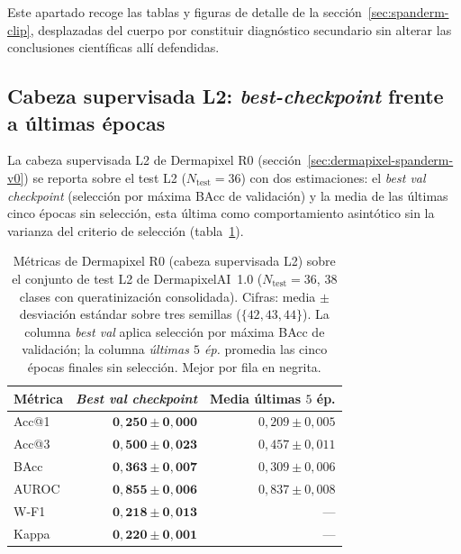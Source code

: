 Este apartado recoge las tablas y figuras de detalle de la
sección~\ref{sec:spanderm-clip}, desplazadas del cuerpo por
constituir diagnóstico secundario sin alterar las conclusiones
científicas allí defendidas.

\subsection{Cabeza supervisada L2: \emph{best-checkpoint} frente a
últimas épocas}
\label{sec:anexoi-l2-checkpoint}

La cabeza supervisada L2 de Dermapixel R0
(sección~\ref{sec:dermapixel-spanderm-v0}) se reporta sobre el test L2
($N_{\mathrm{test}} = 36$) con dos estimaciones: el \emph{best val
checkpoint} (selección por máxima BAcc de validación) y la media de las
últimas cinco épocas sin selección, esta última como comportamiento
asintótico sin la varianza del criterio de selección
(tabla~\ref{tab:dermapixel-spanderm-l2}).

\begin{table}[H]
\centering
\footnotesize
\setlength{\tabcolsep}{4pt}
\renewcommand{\arraystretch}{0.95}
\caption{Métricas de Dermapixel R0 (cabeza supervisada L2) sobre el
conjunto de test L2 de
DermapixelAI~1.0 ($N_{\mathrm{test}} = 36$, $38$ clases con
queratinización consolidada). Cifras: media $\pm$ desviación
estándar sobre tres semillas ($\{42, 43, 44\}$). La columna
\emph{best val} aplica selección por máxima BAcc de validación;
la columna \emph{últimas $5$ ép.} promedia las cinco épocas
finales sin selección. Mejor por fila en negrita.}
\label{tab:dermapixel-spanderm-l2}
\begin{tabular}{lrr}
\hline
Métrica   & \emph{Best val \emph{checkpoint}} & Media últimas $5$ ép. \\
\hline
Acc@1     & $\mathbf{0{,}250 \pm 0{,}000}$ & $0{,}209 \pm 0{,}005$ \\
Acc@3     & $\mathbf{0{,}500 \pm 0{,}023}$ & $0{,}457 \pm 0{,}011$ \\
BAcc      & $\mathbf{0{,}363 \pm 0{,}007}$ & $0{,}309 \pm 0{,}006$ \\
AUROC     & $\mathbf{0{,}855 \pm 0{,}006}$ & $0{,}837 \pm 0{,}008$ \\
W-F1      & $\mathbf{0{,}218 \pm 0{,}013}$ & --- \\
Kappa     & $\mathbf{0{,}220 \pm 0{,}001}$ & --- \\
\hline
\end{tabular}
\end{table}

